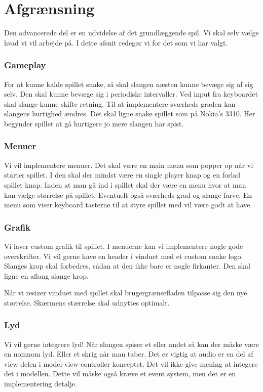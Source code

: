 \section{Afgrænsning}
Den advancerede del er en udvidelse af det grundlæggende spil. Vi skal selv vælge hvad vi vil arbejde på. I dette afsnit redegør vi for det som vi har valgt. 

\subsubsection*{Gameplay}
For at kunne kalde spillet snake, så skal slangen næsten kunne bevæge sig af sig selv. Den skal kunne bevæge sig i periodiske intervaller. Ved input fra keyboardet skal slange kunne skifte retning. Til at implementere sværheds graden kan slangens hurtighed ændres.  Det skal ligne snake spillet som på Nokia's 3310. Her begynder spillet at gå hurtigere jo mere slangen har spist.

\subsubsection*{Menuer}
Vi vil implementere menuer. Det skal være en main menu som popper op når vi starter spillet. I den skal der mindst være  en single player knap og en forlad spillet knap. Inden at man gå ind i spillet skal der være en menu hvor at man kan vælge størrelse på spillet. Eventuelt også sværheds grad og slange farve. En menu som viser keyboard tasterne til at styre spillet med vil være godt at have.

\subsubsection*{Grafik}
Vi laver custom grafik til spillet. I menuerne kan vi implementere nogle gode overskrifter. Vi vil gerne have en header i vinduet med et custom snake logo. Slanges krop skal forbedres, sådan at den ikke bare er nogle firkanter.  Den skal ligne en aflang slange krop. 

Når vi resizer vinduet med spillet skal brugergrænsefladen tilpasse sig den nye størrelse. Skærmens stærrelse skal udnyttes optimalt.

\subsubsection*{Lyd}
Vi vil gerne integrere lyd! Når slangen spiser et eller andet så kan der måske være en nomnom lyd. Eller et skrig når man taber. Det er vigtig at audio er en del af view delen i model-view-controller konceptet. Det vil ikke give mening at integere det i modellen. Dette vil måske også kræve et event system, men det er en implementering detalje.

